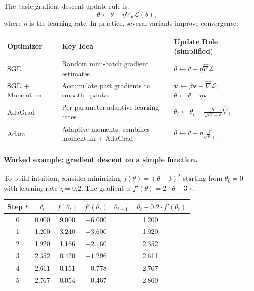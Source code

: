 The basic gradient descent update rule is:
\begin{equation}
\theta \leftarrow \theta - \eta \nabla_\theta \mathcal{L}(\theta),
\end{equation}
where $\eta$ is the learning rate. In practice, several variants improve convergence:

\begin{center}
\renewcommand{\arraystretch}{1.2}
\begin{tabularx}{0.95\textwidth}{L{3cm} Y L{3cm}}
\toprule
\textbf{Optimizer} & \textbf{Key Idea} & \textbf{Update Rule (simplified)} \\
\midrule
SGD & Random mini-batch gradient estimates & $\theta \leftarrow \theta - \eta \hat{\nabla}\mathcal{L}$ \\
SGD + Momentum & Accumulate past gradients to smooth updates & $\mathbf{v} \leftarrow \beta \mathbf{v} + \hat{\nabla}\mathcal{L}$; $\theta \leftarrow \theta - \eta \mathbf{v}$ \\
AdaGrad & Per-parameter adaptive learning rates & $\theta_i \leftarrow \theta_i - \frac{\eta}{\sqrt{G_i + \epsilon}} \hat{\nabla}_i$ \\
Adam & Adaptive moments: combines momentum + AdaGrad & $\theta \leftarrow \theta - \eta \frac{\hat{m}}{\sqrt{\hat{v}} + \epsilon}$ \\
\bottomrule
\end{tabularx}
\end{center}

\paragraph{Worked example: gradient descent on a simple function.} To build intuition, consider minimizing $f(\theta) = (\theta - 3)^2$ starting from $\theta_0 = 0$ with learning rate $\eta = 0.2$. The gradient is $f'(\theta) = 2(\theta - 3)$.

\begin{center}
\renewcommand{\arraystretch}{1.15}
\begin{tabular}{c|c|c|c|c}
\toprule
\textbf{Step} $t$ & $\theta_t$ & $f(\theta_t)$ & $f'(\theta_t)$ & $\theta_{t+1} = \theta_t - 0.2 \cdot f'(\theta_t)$ \\
\midrule
0 & 0.000 & 9.000 & $-6.000$ & 1.200 \\
1 & 1.200 & 3.240 & $-3.600$ & 1.920 \\
2 & 1.920 & 1.166 & $-2.160$ & 2.352 \\
3 & 2.352 & 0.420 & $-1.296$ & 2.611 \\
4 & 2.611 & 0.151 & $-0.778$ & 2.767 \\
5 & 2.767 & 0.054 & $-0.467$ & 2.860 \\
\bottomrule
\end{tabular}
\end{center}

